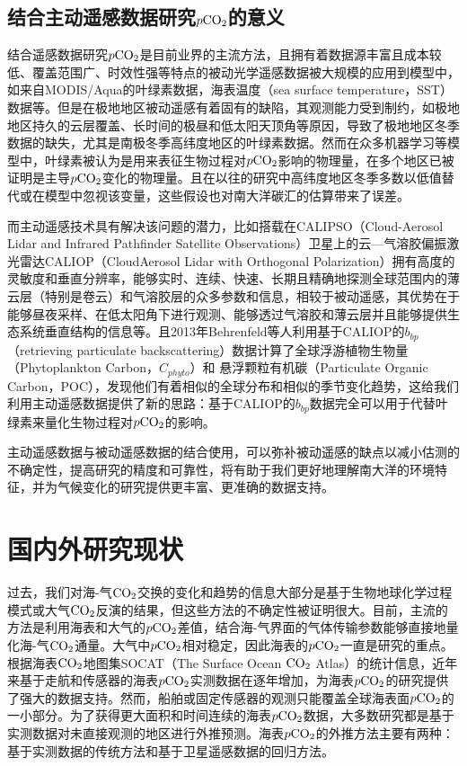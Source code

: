 \subsection{结合主动遥感数据研究\texorpdfstring{$p\rm CO_2$}{}的意义}
结合遥感数据研究$p\rm CO_2$是目前业界的主流方法，且拥有着数据源丰富且成本较低、覆盖范围广、时效性强等特点的被动光学遥感数据被大规模的应用到模型中，如来自MODIS/Aqua的叶绿素数据，海表温度（sea surface temperature，SST）数据等\cite{HBHH201803001}。但是在极地地区被动遥感有着固有的缺陷，其观测能力受到制约，如极地地区持久的云层覆盖、长时间的极昼和低太阳天顶角等原因\cite{2013Space,bbp_Annual_2017}，导致了极地地区冬季数据的缺失，尤其是南极冬季高纬度地区的叶绿素数据。然而在众多机器学习等模型中，叶绿素被认为是用来表征生物过程对$p\rm CO_2$影响的物理量，在多个地区已被证明是主导$p\rm CO_2$变化的物理量\cite{tu2021increase,brown2019enhanced}。且在以往的研究中高纬度地区冬季多数以低值替代\cite{CSIR_ML6,gregor2017empirical,LSCE_FFNN}或在模型中忽视该变量\cite{JMA_MLR,MPI_SOMFFN}，这些假设也对南大洋碳汇的估算带来了误差。

而主动遥感技术具有解决该问题的潜力，比如搭载在CALIPSO（Cloud-Aerosol Lidar and Infrared Pathfinder Satellite Observations）卫星上的云—气溶胶偏振激光雷达CALIOP（CloudAerosol Lidar with Orthogonal Polarization）拥有高度的灵敏度和垂直分辨率，能够实时、连续、快速、长期且精确地探测全球范围内的薄云层（特别是卷云）和气溶胶层的众多参数和信息，相较于被动遥感，其优势在于能够昼夜采样、在低太阳角下进行观测、能够透过气溶胶和薄云层并且能够提供生态系统垂直结构的信息等\cite{CALIPSO_2009}。且2013年Behrenfeld等人\cite{2013Space}利用基于CALIOP的$b_{bp}$（retrieving particulate backscattering）数据计算了全球浮游植物生物量（Phytoplankton Carbon，$C_{phyto}$）和 悬浮颗粒有机碳（Particulate Organic Carbon，POC），发现他们有着相似的全球分布和相似的季节变化趋势，这给我们利用主动遥感数据提供了新的思路：基于CALIOP的$b_{bp}$数据完全可以用于代替叶绿素来量化生物过程对$p\rm CO_2$的影响。

主动遥感数据与被动遥感数据的结合使用，可以弥补被动遥感的缺点以减小估测的不确定性，提高研究的精度和可靠性，将有助于我们更好地理解南大洋的环境特征，并为气候变化的研究提供更丰富、更准确的数据支持。


\section{国内外研究现状}
过去，我们对海-气$\rm CO_2$交换的变化和趋势的信息大部分是基于生物地球化学过程模式或大气$\rm CO_2$反演的结果，但这些方法的不确定性被证明很大\cite{Wanninkhof_2013}。目前，主流的方法是利用海表和大气的$p\rm CO_2$差值，结合海-气界面的气体传输参数能够直接地量化海-气$\rm CO_2$通量。大气中$p\rm CO_2$相对稳定，因此海表的$p\rm CO_2$一直是研究的重点。根据海表$\rm CO_2$地图集SOCAT\cite{socat2016}（The Surface Ocean $\rm CO_2$ Atlas）的统计信息，近年来基于走航和传感器的海表$p\rm CO_2$实测数据在逐年增加，为海表$p\rm CO_2$的研究提供了强大的数据支持。然而，船舶或固定传感器的观测只能覆盖全球海表面$p\rm CO_2$的一小部分。为了获得更大面积和时间连续的海表$p\rm CO_2$数据，大多数研究都是基于实测数据对未直接观测的地区进行外推预测。海表$p\rm CO_2$的外推方法主要有两种：基于实测数据的传统方法和基于卫星遥感数据的回归方法。

